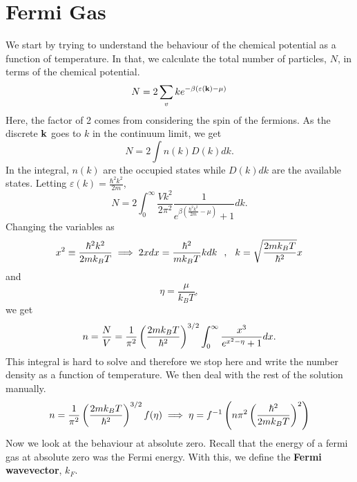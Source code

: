     \section{Fermi Gas}
        We start by trying to understand the behaviour of the chemical potential as a function of temperature. In that, we calculate the total number of particles, $N$, in terms of the chemical potential. 
        \begin{equation}
            N = 2\sum_v{k} e^{-\beta(\varepsilon(\mathbf{k})-\mu)}
        \end{equation}
        Here, the factor of 2 comes from considering the spin of the fermions. As the discrete $\mathbf{k}$ goes to $k$ in the continuum limit, we get
        \begin{equation}
            N = 2\int n(k)D(k)dk.
        \end{equation}
        In the integral, $n(k)$ are the occupied states while $D(k)dk$ are the available states. Letting $\varepsilon(k)=\frac{\hbar^2k^2}{2m}$,
        \begin{equation}
            N = 2\int_{0}^{\infty}\frac{Vk^2}{2\pi^2}\frac{1}{e^{\beta(\frac{\hbar^2k^2}{2m}-\mu)}+1}dk.
        \end{equation}
        Changing the variables as
        \begin{equation}
            x^2 \equiv \frac{\hbar^2k^2}{2mk_BT} \implies 2xdx = \frac{\hbar^2}{mk_BT}kdk\hspace{0.25cm},\hspace{0.25cm}k=\sqrt{\frac{2mk_BT}{\hbar^2}}x
        \end{equation}
        and 
        \begin{equation}
            \eta = \frac{\mu}{k_BT},
        \end{equation}
        we get
        \begin{equation}
            n = \frac{N}{V}=\frac{1}{\pi^2}\left( \frac{2mk_BT}{\hbar^2} \right)^{3/2}\int_{0}^{\infty}\frac{x^3}{e^{x^2-\eta}+1}dx.
        \end{equation}
        This integral is hard to solve and therefore we stop here and write the number density as a function of temperature. We then deal with the rest of the solution manually.
        \begin{equation}
            n = \frac{1}{\pi^2}\left( \frac{2mk_BT}{\hbar^2} \right)^{3/2}f(\eta)\implies \eta = f^{-1}\left( n\pi^2\left( \frac{\hbar^2}{2mk_BT} \right)^2 \right)
        \end{equation}
        Now we look at the behaviour at absolute zero. Recall that the energy of a fermi gas at absolute zero was the Fermi energy. With this, we define the \textbf{Fermi wavevector}, $k_F$.
